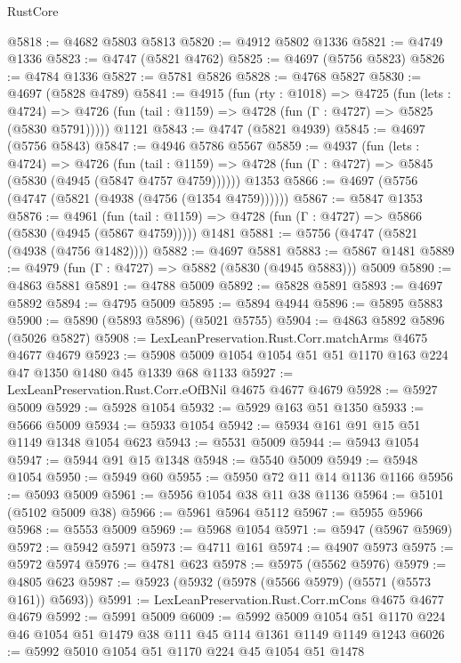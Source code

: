 \begin{lexlean}{RustCore}
\begin{coremodule}
@5818 := @4682 @5803 @5813
@5820 := @4912 @5802 @1336
@5821 := @4749 @1336
@5823 := @4747 (@5821 @4762)
@5825 := @4697 (@5756 @5823)
@5826 := @4784 @1336
@5827 := @5781 @5826
@5828 := @4768 @5827
@5830 := @4697 (@5828 @4789)
@5841 := @4915
    (fun (rty : @1018) =>
    @4725
      (fun (lets : @4724) =>
      @4726 (fun (tail : @1159) => @4728 (fun (Γ : @4727) => @5825 (@5830 @5791)))))
    @1121
@5843 := @4747 (@5821 @4939)
@5845 := @4697 (@5756 @5843)
@5847 := @4946 @5786 @5567
@5859 := @4937
    (fun (lets : @4724) =>
    @4726
      (fun (tail : @1159) => @4728 (fun (Γ : @4727) => @5845 (@5830 (@4945 (@5847 @4757 @4759))))))
    @1353
@5866 := @4697 (@5756 (@4747 (@5821 (@4938 (@4756 (@1354 @4759))))))
@5867 := @5847 @1353
@5876 := @4961
    (fun (tail : @1159) => @4728 (fun (Γ : @4727) => @5866 (@5830 (@4945 (@5867 @4759)))))
    @1481
@5881 := @5756 (@4747 (@5821 (@4938 (@4756 @1482))))
@5882 := @4697 @5881
@5883 := @5867 @1481
@5889 := @4979 (fun (Γ : @4727) => @5882 (@5830 (@4945 @5883))) @5009
@5890 := @4863 @5881
@5891 := @4788 @5009
@5892 := @5828 @5891
@5893 := @4697 @5892
@5894 := @4795 @5009
@5895 := @5894 @4944
@5896 := @5895 @5883
@5900 := @5890 (@5893 @5896) (@5021 @5755)
@5904 := @4863 @5892 @5896 (@5026 @5827)
@5908 := LexLeanPreservation.Rust.Corr.matchArms @4675 @4677 @4679
@5923 := @5908 @5009 @1054 @1054 @51 @51 @1170 @163 @224 @47 @1350 @1480 @45 @1339 @68 @1133
@5927 := LexLeanPreservation.Rust.Corr.eOfBNil @4675 @4677 @4679
@5928 := @5927 @5009
@5929 := @5928 @1054
@5932 := @5929 @163 @51 @1350
@5933 := @5666 @5009
@5934 := @5933 @1054
@5942 := @5934 @161 @91 @15 @51 @1149 @1348 @1054 @623
@5943 := @5531 @5009
@5944 := @5943 @1054
@5947 := @5944 @91 @15 @1348
@5948 := @5540 @5009
@5949 := @5948 @1054
@5950 := @5949 @60
@5955 := @5950 @72 @11 @14 @1136 @1166
@5956 := @5093 @5009
@5961 := @5956 @1054 @38 @11 @38 @1136
@5964 := @5101 (@5102 @5009 @38)
@5966 := @5961 @5964 @5112
@5967 := @5955 @5966
@5968 := @5553 @5009
@5969 := @5968 @1054
@5971 := @5947 (@5967 @5969)
@5972 := @5942 @5971
@5973 := @4711 @161
@5974 := @4907 @5973
@5975 := @5972 @5974
@5976 := @4781 @623
@5978 := @5975 (@5562 @5976)
@5979 := @4805 @623
@5987 := @5923 (@5932 (@5978 (@5566 @5979) (@5571 (@5573 @161)) @5693))
@5991 := LexLeanPreservation.Rust.Corr.mCons @4675 @4677 @4679
@5992 := @5991 @5009
@6009 := @5992
    @5009
    @1054
    @51
    @1170
    @224
    @46
    @1054
    @51
    @1479
    @38
    @111
    @45
    @114
    @1361
    @1149
    @1149
    @1243
@6026 := @5992
    @5010
    @1054
    @51
    @1170
    @224
    @45
    @1054
    @51
    @1478

\end{coremodule}
\end{lexlean}
